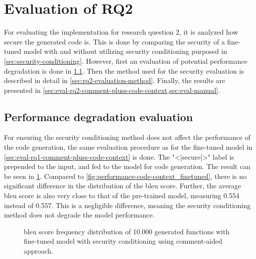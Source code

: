 \FloatBarrier

\section{Evaluation of RQ2}
\label{sec:rq2-evaluation}
For evaluating the implementation for research question 2, it is analyzed how secure the generated code is. This is done by comparing the security of a fine-tuned model with and without utilizing security conditioning purposed in \cref{sec:security-conditioning}. However,  first an evaluation of potential performance degradation is done in \cref{sec:rq2-performance-degradation-evaluation}. Then the method used for the security evaluation is described in detail in \cref{sec:rq2-evaluation-method}. Finally, the results are presented in \cref{sec:eval-rq2-comment-pluss-code-context,sec:eval-manual}.


\subsection{Performance degradation evaluation}
\label{sec:rq2-performance-degradation-evaluation}
For ensuring the security conditioning method does not affect the performance of the code generation, the same evaluation procedure as for the fine-tuned model in \cref{sec:eval-rq1-comment-pluss-code-context} is done. The "<|secure|>" label is prepended to the input, and fed to the model for code generation. The result can be seen in \cref{fig:performance-code-context_audit_secure}. Compared to \cref{fig:performance-code-context_finetuned}, there is no significant difference in the distribution of the \acrshort{bleu} score. Further, the average \acrshort{bleu} score is also very close to that of the pre-trained model, measuring 0.554 instead of 0.557. This is a negligible difference, meaning the security conditioning method does not degrade the model performance.

\begin{figure}[htp]
    \centering
    
    \caption{\acrshort{bleu} score frequency distribution of 10.000 generated functions with fine-tuned model with security conditioning using comment-aided approach.}
    \label{fig:performance-code-context_audit_secure}
\end{figure}


